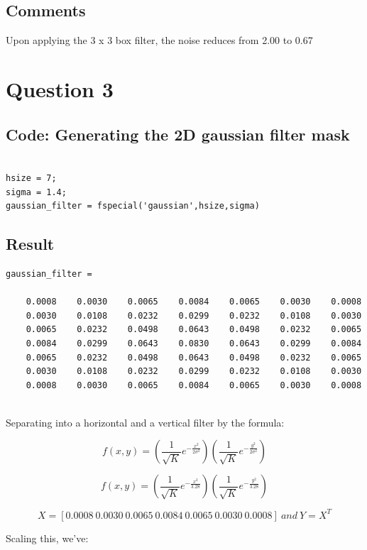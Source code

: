 \documentclass{article}
\begin{document}
\subsection{Comments}
Upon applying the 3 x 3 box filter, the noise reduces from 2.00 to 0.67



\section{Question 3}


\subsection{Code: Generating the 2D gaussian filter mask}
\begin{verbatim}

hsize = 7;
sigma = 1.4;
gaussian_filter = fspecial('gaussian',hsize,sigma)
\end{verbatim}

\subsection{Result}
\begin{verbatim}
gaussian_filter =

    0.0008    0.0030    0.0065    0.0084    0.0065    0.0030    0.0008
    0.0030    0.0108    0.0232    0.0299    0.0232    0.0108    0.0030
    0.0065    0.0232    0.0498    0.0643    0.0498    0.0232    0.0065
    0.0084    0.0299    0.0643    0.0830    0.0643    0.0299    0.0084
    0.0065    0.0232    0.0498    0.0643    0.0498    0.0232    0.0065
    0.0030    0.0108    0.0232    0.0299    0.0232    0.0108    0.0030
    0.0008    0.0030    0.0065    0.0084    0.0065    0.0030    0.0008
    
\end{verbatim}  

Separating into a horizontal and a vertical filter by the formula:

\[
  f(x, y) = (\frac{1}{\sqrt{K}} e^{- \frac{x^{2}} {2 \sigma^{2}} }) (\frac{1}{\sqrt{K}} e^{- \frac{y^{2}} {2 \sigma^{2}} })
  \]

\[
  f(x, y) = (\frac{1}{\sqrt{K}} e^{- \frac{x^{2}}{3.28}}) (\frac{1}{\sqrt{K}} e^{- \frac{y^{2}} {3.28}})
\]

\[
X = [0.0008\    0.0030\    0.0065\    0.0084\    0.0065\    0.0030\    0.0008]\ and\ Y = X^{T}
\]

Scaling this, we've:
\end{document}
